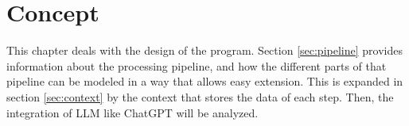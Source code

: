 \begingroup
\renewcommand{\cleardoublepage}{} %
\renewcommand{\clearpage}{}
\chapter{Concept}\label{chapter:conception}
\endgroup
This chapter deals with the design of the program. Section \ref{sec:pipeline}  provides information about the processing pipeline, and how the different parts of that pipeline can be modeled in a way that allows easy extension. This is expanded in section \ref{sec:context} by the context that stores the data of each step. Then, the integration of \ac{LLM} like ChatGPT will be analyzed. 




